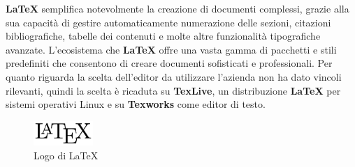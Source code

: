 \noindent \textbf{LaTeX} semplifica notevolmente la creazione di documenti complessi, grazie alla sua capacità di gestire automaticamente numerazione delle sezioni, citazioni bibliografiche, tabelle dei contenuti e molte altre funzionalità tipografiche avanzate.
L'ecosistema che \textbf{LaTeX} offre una vasta gamma di pacchetti e stili predefiniti che consentono di creare documenti sofisticati e professionali.
Per quanto riguarda la scelta dell'editor da utilizzare l'azienda non ha dato vincoli rilevanti, quindi la scelta è ricaduta su \textbf{TexLive}, un distribuzione \textbf{LaTeX} per sistemi operativi Linux e su \textbf{Texworks} come editor di testo.
\begin{figure}[hpp]
    \centering
    \includegraphics[width=0.2\textwidth]{images/tecnologie/logo_latex.png}
    \caption{Logo di LaTeX}
    \label{fig:latex}
\end{figure}
\newpage
\pagestyle{empty}
\null %
\newpage